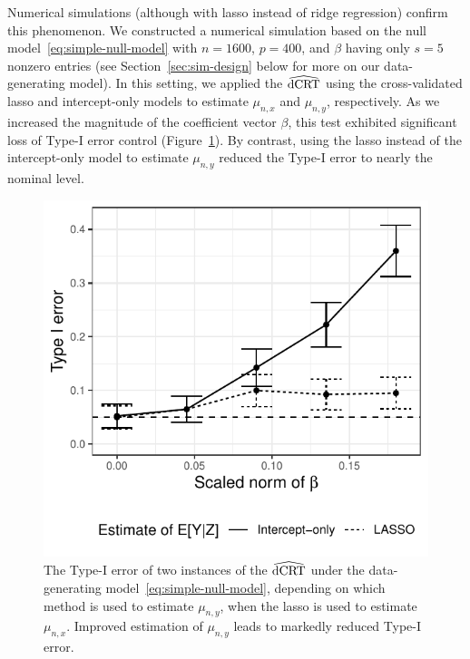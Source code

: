 \documentclass[12pt]{article}
\theoremstyle{definition}
\theoremstyle{remark}
\newcommand{\dCRThat}{\widehat{\textnormal{dCRT}}}		%
\begin{document}
	Numerical simulations (although with lasso instead of ridge regression) confirm this phenomenon. We constructed a numerical simulation based on the null model~\eqref{eq:simple-null-model} with $n = 1600$,  $p = 400$, and $\beta$ having only $s = 5$ nonzero entries (see Section~\ref{sec:sim-design} below for more on our data-generating model). In this setting, we applied the $\dCRThat$ using the cross-validated lasso and intercept-only models to estimate $\mu_{n,x}$ and $\mu_{n,y}$, respectively. As we increased the magnitude of the coefficient vector $\beta$, this test exhibited significant loss of Type-I error control (Figure~\ref{fig:negative_Result}). By contrast, using the lasso instead of the intercept-only model to estimate $\mu_{n,y}$ reduced the Type-I error to nearly the nominal level.
	\begin{figure}[!ht]
		\centering
		\includegraphics[scale = 1]{figures/negative_result_dCRT.pdf}
		\caption{The Type-I error of two instances of the $\dCRThat$ under the data-generating model~\eqref{eq:simple-null-model}, depending on which method is used to estimate $\mu_{n,y}$, when the lasso is used to estimate $\mu_{n,x}$. Improved estimation of $\mu_{n,y}$ leads to markedly reduced Type-I error.}
		\label{fig:negative_Result}
	\end{figure}
	
\end{document}
